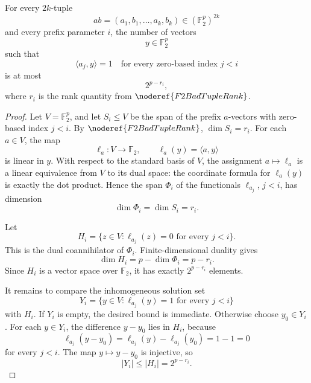 \begin{helper}
For every \(2k\)-tuple
\[
  ab=(a_1,b_1,\ldots,a_k,b_k)\in(\mathbb F_2^p)^{2k}
\]
and every prefix parameter \(i\), the number of vectors
\[
  y\in\mathbb F_2^p
\]
such that
\[
  \langle a_j,y\rangle=1
  \quad\text{for every zero-based index }j<i
\]
is at most
\[
  2^{p-r_i},
\]
where \(r_i\) is the rank quantity from \(\noderef{F2BadTupleRank}\).
\end{helper}
\begin{proof}
Let \(V=\mathbb F_2^p\), and let \(S_i\le V\) be the span of the prefix
\(a\)-vectors with zero-based index \(j<i\). By \(\noderef{F2BadTupleRank}\),
\(\dim S_i=r_i\). For each \(a\in V\), the map
\[
  \ell_a:V\to\mathbb F_2,\qquad \ell_a(y)=\langle a,y\rangle
\]
is linear in \(y\). With respect to the standard basis of \(V\), the assignment
\(a\mapsto \ell_a\) is a linear equivalence from \(V\) to its dual space: the
coordinate formula for \(\ell_a(y)\) is exactly the dot product. Hence the span
\(\Phi_i\) of the functionals \(\ell_{a_j}\), \(j<i\), has dimension
\[
  \dim \Phi_i=\dim S_i=r_i.
\]

Let
\[
  H_i=\{z\in V:\ell_{a_j}(z)=0\text{ for every }j<i\}.
\]
This is the dual coannihilator of \(\Phi_i\). Finite-dimensional duality gives
\[
  \dim H_i=p-\dim\Phi_i=p-r_i.
\]
Since \(H_i\) is a vector space over \(\mathbb F_2\), it has exactly
\(2^{p-r_i}\) elements.

It remains to compare the inhomogeneous solution set
\[
  Y_i=\{y\in V:\ell_{a_j}(y)=1\text{ for every }j<i\}
\]
with \(H_i\). If \(Y_i\) is empty, the desired bound is immediate. Otherwise
choose \(y_0\in Y_i\). For each \(y\in Y_i\), the difference \(y-y_0\) lies in
\(H_i\), because
\[
  \ell_{a_j}(y-y_0)=\ell_{a_j}(y)-\ell_{a_j}(y_0)=1-1=0
\]
for every \(j<i\). The map \(y\mapsto y-y_0\) is injective, so
\[
  |Y_i|\le |H_i|=2^{p-r_i}.
\]
\end{proof}
